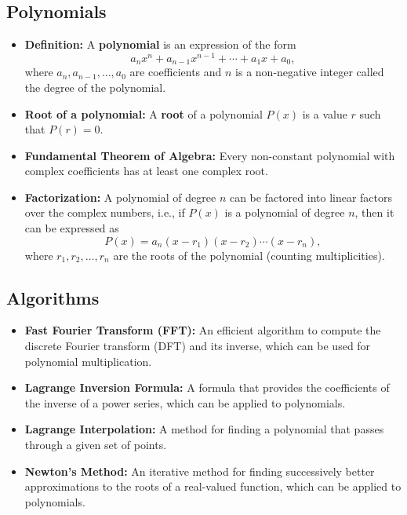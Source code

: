 \subsection{Polynomials}

\begin{itemize}
    \item \textbf{Definition: } A \textbf{polynomial} is an expression of the form
          \[
              a_n x^n + a_{n-1} x^{n-1} + \cdots + a_1 x + a_0,
          \]
          where $a_n, a_{n-1}, \ldots, a_0$ are coefficients and $n$ is a non-negative integer called the degree of the polynomial.

    \item \textbf{Root of a polynomial: } A \textbf{root} of a polynomial $P(x)$ is a value $r$ such that $P(r) = 0$.

    \item \textbf{Fundamental Theorem of Algebra: } Every non-constant polynomial with complex coefficients has at least one complex root.

    \item \textbf{Factorization: } A polynomial of degree $n$ can be factored into linear factors over the complex numbers, i.e., if $P(x)$ is a polynomial of degree $n$, then it can be expressed as
          \[
              P(x) = a_n (x - r_1)(x - r_2) \cdots (x - r_n),
          \]
          where $r_1, r_2, \ldots, r_n$ are the roots of the polynomial (counting multiplicities).


\end{itemize}

\subsection{Algorithms}
\begin{itemize}
    \item \textbf{Fast Fourier Transform (FFT): } An efficient algorithm to compute the discrete Fourier transform (DFT) and its inverse, which can be used for polynomial multiplication.
    \item \textbf{Lagrange Inversion Formula: } A formula that provides the coefficients of the inverse of a power series, which can be applied to polynomials.
    \item \textbf{Lagrange Interpolation: } A method for finding a polynomial that passes through a given set of points.
    \item \textbf{Newton's Method: } An iterative method for finding successively better approximations to the roots of a real-valued function, which can be applied to polynomials.
\end{itemize}
